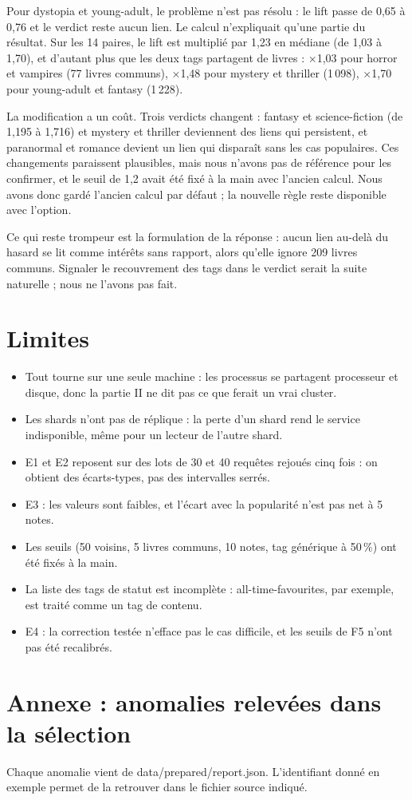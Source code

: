 \documentclass[11pt,a4paper]{article}
\begin{document}
Pour dystopia et young-adult, le problème n'est pas résolu : le lift passe de 0,65 à 0,76 et le verdict reste \og aucun lien\fg{}. Le calcul n'expliquait qu'une partie du résultat. Sur les 14 paires, le lift est multiplié par 1,23 en médiane (de 1,03 à 1,70), et d'autant plus que les deux tags partagent de livres : ×1,03 pour horror et vampires (77 livres communs), ×1,48 pour mystery et thriller (1\,098), ×1,70 pour young-adult et fantasy (1\,228).

La modification a un coût. Trois verdicts changent : fantasy et science-fiction (de 1,195 à 1,716) et mystery et thriller deviennent des liens qui persistent, et paranormal et romance devient un lien qui disparaît sans les cas populaires. Ces changements paraissent plausibles, mais nous n'avons pas de référence pour les confirmer, et le seuil de 1,2 avait été fixé à la main avec l'ancien calcul. Nous avons donc gardé l'ancien calcul par défaut ; la nouvelle règle reste disponible avec l'option.

Ce qui reste trompeur est la formulation de la réponse : \og aucun lien au-delà du hasard\fg{} se lit comme \og intérêts sans rapport\fg{}, alors qu'elle ignore 209 livres communs. Signaler le recouvrement des tags dans le verdict serait la suite naturelle ; nous ne l'avons pas fait.

\section{Limites}
\begin{itemize}
\item Tout tourne sur une seule machine : les processus se partagent processeur et disque, donc la partie II ne dit pas ce que ferait un vrai cluster.
\item Les shards n'ont pas de réplique : la perte d'un shard rend le service indisponible, même pour un lecteur de l'autre shard.
\item E1 et E2 reposent sur des lots de 30 et 40 requêtes rejoués cinq fois : on obtient des écarts-types, pas des intervalles serrés.
\item E3 : les valeurs sont faibles, et l'écart avec la popularité n'est pas net à 5 notes.
\item Les seuils (50 voisins, 5 livres communs, 10 notes, tag générique à 50\,\%) ont été fixés à la main.
\item La liste des tags de statut est incomplète : all-time-favourites, par exemple, est traité comme un tag de contenu.
\item E4 : la correction testée n'efface pas le cas difficile, et les seuils de F5 n'ont pas été recalibrés.
\end{itemize}
\clearpage
{}\section*{Annexe : anomalies relevées dans la sélection}
Chaque anomalie vient de data/prepared/report.json. L'identifiant donné en exemple permet de la retrouver dans le fichier source indiqué.
\end{document}
